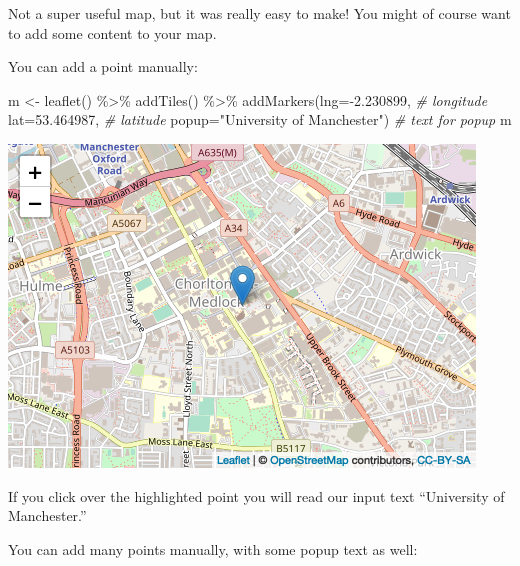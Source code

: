 \documentclass[
  krantz2]{krantz}
\makeatletter
\newenvironment{Shaded}{\begin{snugshade}}{\end{snugshade}}
\newcommand{\AttributeTok}[1]{\textcolor[rgb]{0.61,0.61,0.61}{#1}}
\newcommand{\CommentTok}[1]{\textcolor[rgb]{0.37,0.37,0.37}{\textit{#1}}}
\newcommand{\FloatTok}[1]{\textcolor[rgb]{0.06,0.06,0.06}{#1}}
\newcommand{\FunctionTok}[1]{\textcolor[rgb]{0,0,0}{#1}}
\newcommand{\NormalTok}[1]{#1}
\newcommand{\OtherTok}[1]{\textcolor[rgb]{0.37,0.37,0.37}{#1}}
\newcommand{\SpecialCharTok}[1]{\textcolor[rgb]{0,0,0}{#1}}
\newcommand{\StringTok}[1]{\textcolor[rgb]{0.5,0.5,0.5}{#1}}
\newenvironment{kframe}{%
\medskip{}
\setlength{\fboxsep}{.8em}
 \def\at@end@of@kframe{}%
 \ifinner\ifhmode%
  \def\at@end@of@kframe{\end{minipage}}%
  \begin{minipage}{\columnwidth}%
 \fi\fi%
 \def\FrameCommand##1{\hskip\@totalleftmargin \hskip-\fboxsep
 \colorbox{shadecolor}{##1}\hskip-\fboxsep
     \hskip-\linewidth \hskip-\@totalleftmargin \hskip\columnwidth}%
 \MakeFramed {\advance\hsize-\width
   \@totalleftmargin\z@ \linewidth\hsize
   \@setminipage}}%
 {\par\unskip\endMakeFramed%
 \at@end@of@kframe}
\renewenvironment{Shaded}{\begin{kframe}}{\end{kframe}}
\makeatother
\begin{document}
Not a super useful map, but it was really easy to make! You might of course want to add some content to your map.

You can add a point manually:

\begin{Shaded}
\begin{Highlighting}[]
\NormalTok{m }\OtherTok{\textless{}{-}} \FunctionTok{leaflet}\NormalTok{() }\SpecialCharTok{\%\textgreater{}\%} \FunctionTok{addTiles}\NormalTok{()  }\SpecialCharTok{\%\textgreater{}\%} 
  \FunctionTok{addMarkers}\NormalTok{(}\AttributeTok{lng=}\SpecialCharTok{{-}}\FloatTok{2.230899}\NormalTok{,  }\CommentTok{\# longitude}
             \AttributeTok{lat=}\FloatTok{53.464987}\NormalTok{,  }\CommentTok{\# latitude}
             \AttributeTok{popup=}\StringTok{"University of Manchester"}\NormalTok{) }\CommentTok{\# text for popup}
\NormalTok{m  }
\end{Highlighting}
\end{Shaded}

\includegraphics{crime_mapping_files/figure-latex/unnamed-chunk-49-1.png}

If you click over the highlighted point you will read our input text ``University of Manchester.''

You can add many points manually, with some popup text as well:
\end{document}
